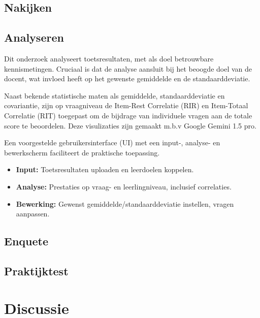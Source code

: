 \documentclass[12pt]{article}
\begin{document}
\subsection{Nakijken}


\subsection{Analyseren}
\begin{multicols}{2}
Dit onderzoek analyseert toetsresultaten, met als doel betrouwbare kennismetingen. Cruciaal is dat de analyse aansluit bij het beoogde doel van de docent, wat invloed heeft op het gewenste gemiddelde en de standaarddeviatie.

Naast bekende statistische maten als gemiddelde, standaarddeviatie en covariantie, zijn op vraagniveau de Item-Rest Correlatie (RIR) en Item-Totaal Correlatie (RIT) toegepast om de bijdrage van individuele vragen aan de totale score te beoordelen. Deze visulizaties zijn gemaakt m.b.v Google Gemini 1.5 pro.

Een voorgestelde gebruikersinterface (UI) met een input-, analyse- en bewerkscherm faciliteert de praktische toepassing. 
\begin{itemize}
    \item \textbf{Input:} Toetsresultaten uploaden en leerdoelen koppelen.
    \item \textbf{Analyse:} Prestaties op vraag- en leerlingniveau, inclusief correlaties.
    \item \textbf{Bewerking:} Gewenst gemiddelde/standaarddeviatie instellen, vragen aanpassen.
\end{itemize}
\end{multicols}
\subsection{Enquete}


\subsection{Praktijktest}

\pagebreak
\section{Discussie}
\end{document}
